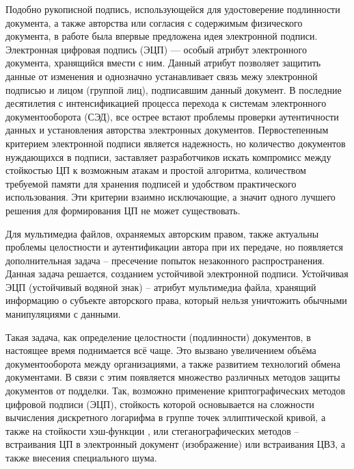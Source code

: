 \par \hspace{1.25cm} Подобно рукописной подпись, использующейся для удостоверение подлинности
 документа, а также авторства или согласия с содержимым физического документа, в работе \cite{diffie1976} была впервые предложена идея электронной подписи. Электронная цифровая подпись (ЭЦП) --- особый атрибут электронного документа, хранящийся вмести с ним. Данный атрибут позволяет защитить данные от изменения и однозначно устанавливает связь межу электронной подписью и лицом (группой лиц), подписавшим данный документ. В последние десятилетия с интенсификацией процесса перехода
  к системам электронного документооборота (СЭД), все острее встают проблемы
   проверки аутентичности данных и установления авторства электронных
    документов. Первостепенным критерием электронной подписи является надежность, но количество документов нуждающихся в подписи, заставляет разработчиков искать компромисс между стойкостью ЦП к возможным атакам и простой алгоритма, количеством требуемой памяти для хранения подписей и удобством практического использования. Эти критерии взаимно исключающие, а значит одного лучшего решения для формирования ЦП не может существовать. 
\par Для мультимедиа файлов, охраняемых авторским правом, также актуальны
 проблемы целостности и аутентификации автора при их передаче, но
  появляется дополнительная задача – пресечение попыток незаконного
   распространения. Данная задача решается, созданием устойчивой электронной
    подписи. Устойчивая ЭЦП (устойчивый водяной знак) -- атрибут мультимедиа файла, хранящий информацию о субъекте авторского права, который нельзя уничтожить обычными манипуляциями с данными. 
\par Такая задача, как определение целостности (подлинности) документов, в
 настоящее время поднимается всё чаще. Это вызвано увеличением объёма документооборота между организациями, а также развитием технологий обмена документами. В связи с этим появляется множество различных методов защиты документов от подделки. Так, возможно применение криптографических методов цифровой подписи (ЭЦП), стойкость которой основывается на сложности вычисления дискретного логарифма в группе точек эллиптической кривой, а также на стойкости хэш-функции \cite{gost34.10}, или стеганографических методов \cite{gupta2015} – встраивания ЦП в электронный документ (изображение) или встраивания ЦВЗ, а также внесения специального шума. 